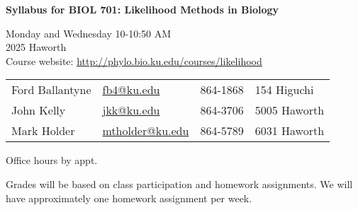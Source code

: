 \documentclass[11pt]{article}
\newcommand{\href}[2]{\url{#2}}
\begin{document}
\pagestyle{empty}

\begin{center}
{\bf \large Syllabus for BIOL 701:  Likelihood Methods in Biology}
\end{center}
Monday and Wednesday 10-10:50 AM\\
2025 Haworth\\
Course website: \url{http://phylo.bio.ku.edu/courses/likelihood}


\begin{table}[h]
\begin{tabular}{llrl}
\hline
Ford Ballantyne & \href{mailto:fb4@ku.edu}{fb4@ku.edu}& 864-1868 & 154 Higuchi\\
John Kelly & \href{mailto:jkk@ku.edu}{jkk@ku.edu}& 864-3706 & 5005 Haworth \\
Mark Holder&  \href{mailto:mtholder@ku.edu}{mtholder@ku.edu}& 864-5789& 6031 Haworth \\
\hline
\end{tabular}
\end{table}%
Office hours by appt.

Grades will be based on class participation and homework assignments. 
We will have approximately one homework assignment per week.
\end{document}
